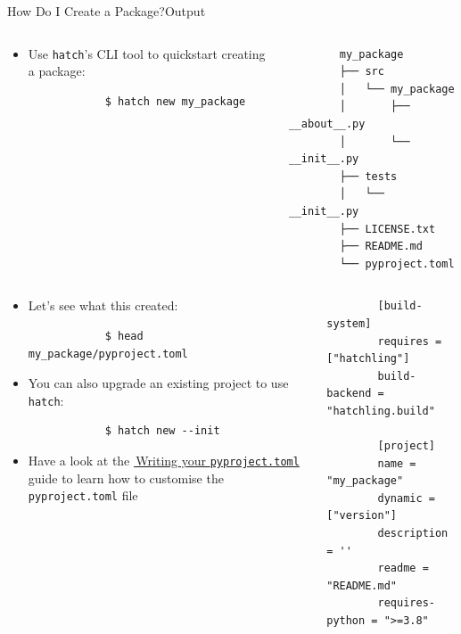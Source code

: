 \begin{splitframe}[fragile]{How Do I Create a Package?}{Output}
  \begin{columns}[t,onlytextwidth]
    \begin{column}{0.58\textwidth}
      \begin{itemize}
        \item Use \textcolor{cpink}{\texttt{hatch}}'s CLI tool to quickstart creating a package:
          \begin{verbatim}
            $ hatch new my_package
          \end{verbatim}
      \end{itemize}
    \end{column}
    \hfill
    \begin{column}{0.38\textwidth}
      \begin{verbatim}
        my_package
        ├── src
        │   └── my_package
        │       ├── __about__.py
        │       └── __init__.py
        ├── tests
        │   └── __init__.py
        ├── LICENSE.txt
        ├── README.md
        └── pyproject.toml
      \end{verbatim}
    \end{column}
  \end{columns}
  \vspace{1em}
  \begin{columns}[t,onlytextwidth]
    \begin{column}{0.58\textwidth}
      \begin{itemize}
        \setlength{\itemsep}{1em}
        \item Let's see what this created:
          \begin{verbatim}
            $ head my_package/pyproject.toml
          \end{verbatim}
        \item You can also upgrade an existing project to use \texttt{hatch}:
          \begin{verbatim}
            $ hatch new --init
          \end{verbatim}
        \item Have a look at the \href{https://packaging.python.org/en/latest/guides/writing-pyproject-toml/}{{\footnotesize{\faExternalLink*}}\,Writing your \texttt{pyproject.toml}}
          guide to learn how to customise the \texttt{pyproject.toml} file
      \end{itemize}
    \end{column}
    \begin{column}{0.38\textwidth}
      \begin{verbatim}
        [build-system]
        requires = ["hatchling"]
        build-backend = "hatchling.build"

        [project]
        name = "my_package"
        dynamic = ["version"]
        description = ''
        readme = "README.md"
        requires-python = ">=3.8"
      \end{verbatim}
    \end{column}
  \end{columns}
\end{splitframe}

